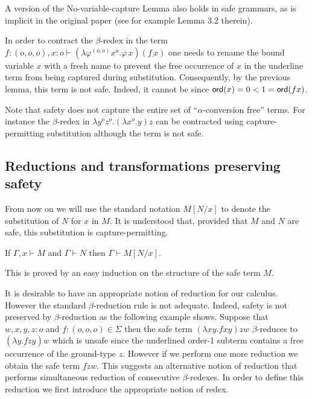 \documentclass{llncs}
\newcommand\subst[2]{\left[ #1/#2 \right]}
\begin{document}
\begin{remark}
  A version of the No-variable-capture Lemma also holds in safe
  grammars, as is implicit in the original paper \cite{KNU02} (see for
  example Lemma 3.2 therein).
\end{remark}

\begin{example}
  In order to contract the $\beta$-redex in the term $f:(o,o,o),x:o
  \vdash (\lambda \varphi^{(o,o)} x^o . \varphi \, x) (\underline{f \, x})$
  one needs to rename the bound variable $x$ with a fresh name to
  prevent the free occurrence of $x$ in the underline term from being
  captured during substitution. Consequently, by the previous lemma,
  this term is not safe. Indeed, it cannot be since ${\sf ord}(x) = 0
  < 1 = {\sf ord}(f x)$.
\end{example}

Note that safety does not capture the entire set of
``$\alpha$-conversion free'' terms. For instance the $\beta$-redex in
$\lambda y^o z^o. (\lambda x^o .y) z$ can be contracted using
capture-permitting substitution although the term is not safe.

\subsection{Reductions and transformations preserving safety}

From now on we will use the standard notation $M\subst{N}{x}$ to
denote the substitution of $N$ for $x$ in $M$.  It is understood that,
provided that $M$ and $N$ are safe, this substitution is
capture-permitting.


\begin{lemma}
\label{lem:subst_preserve_safety}
If $\Gamma, x \vdash M$ and $\Gamma \vdash N$ then $\Gamma \vdash M[N/x]$.
\end{lemma}
This is proved by an easy induction on the structure of the safe term $M$.


It is desirable to have an appropriate notion of reduction for our
calculus. However the standard $\beta$-reduction rule is not
adequate. Indeed, safety is not preserved by $\beta$-reduction as the
following example shows. Suppose that $w,x,y,z : o$ and $f : (o,o,o)
\in \Sigma$ then the safe term $(\lambda x y . f x y) z w$
$\beta$-reduces to $(\underline{\lambda y . f z y}) w$ which is unsafe
since the underlined order-1 subterm contains a free occurrence of the
ground-type $z$. However if we perform one more reduction we obtain
the safe term $f z w$. This suggests an alternative notion of
reduction that performs simultaneous reduction of consecutive
$\beta$-redexes. In order to define this reduction we first introduce
the appropriate notion of redex.
\end{document}
